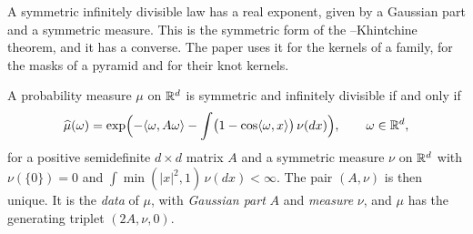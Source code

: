 A symmetric infinitely divisible law has a real exponent, given by a Gaussian part and a
symmetric \Levy{} measure. This is the symmetric form of the \Levy--Khintchine theorem, and it has
a converse. The paper uses it for the kernels of a family, for the masks of a pyramid and for their
knot kernels.

\begin{lemma}
\label{lem:symmetric-levy-khintchine}

A probability measure $\mu$ on $\mathbb{R}^d$ is symmetric and infinitely divisible if and only if
\[
  \widehat\mu(\omega) = \exp\Bigl(-\langle\omega, A\omega\rangle
  - \int\bigl(1 - \cos\langle\omega, x\rangle\bigr)\,\nu(dx)\Bigr), \qquad \omega \in \mathbb{R}^d,
\]
for a positive semidefinite $d \times d$ matrix $A$ and a symmetric measure $\nu$ on $\mathbb{R}^d$ with
$\nu(\{0\}) = 0$ and $\int\min(|x|^2, 1)\,\nu(dx) < \infty$. The pair $(A, \nu)$ is then unique. It
is the \emph{\Levy{} data} of $\mu$, with \emph{Gaussian part} $A$ and \emph{\Levy{} measure} $\nu$,
and $\mu$ has the generating triplet $(2A, \nu, 0)$.
\end{lemma}

